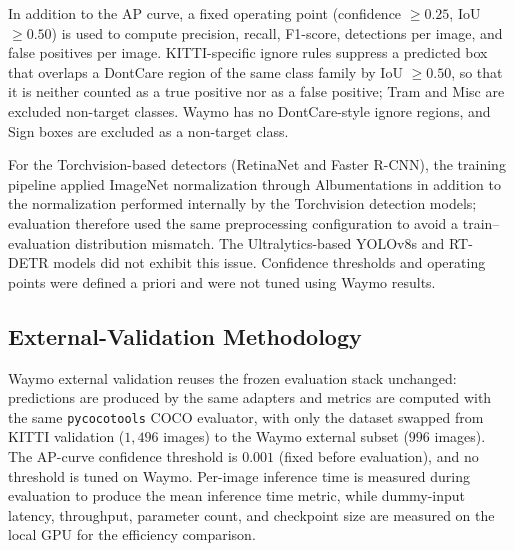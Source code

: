 In addition to the AP curve, a fixed operating point (confidence $\geq 0.25$, IoU $\geq
0.50$) is used to compute precision, recall, F1-score, detections per image, and false
positives per image. KITTI-specific ignore rules suppress a predicted box that overlaps a
DontCare region of the same class family by IoU $\geq 0.50$, so that it is neither counted
as a true positive nor as a false positive; Tram and Misc are excluded non-target classes.
Waymo has no DontCare-style ignore regions, and Sign boxes are excluded as a non-target
class.

For the Torchvision-based detectors (RetinaNet and Faster R-CNN), the training pipeline
applied ImageNet normalization through Albumentations in addition to the normalization
performed internally by the Torchvision detection models; evaluation therefore used the
same preprocessing configuration to avoid a train--evaluation distribution mismatch. The
Ultralytics-based YOLOv8s and RT-DETR models did not exhibit this issue. Confidence
thresholds and operating points were defined a priori and were not tuned using Waymo
results.

\subsection{External-Validation Methodology}
\label{sec:setup_external}

Waymo external validation reuses the frozen evaluation stack unchanged: predictions are
produced by the same adapters and metrics are computed with the same
\texttt{pycocotools} COCO evaluator, with only the dataset swapped from KITTI validation
($1{,}496$ images) to the Waymo external subset ($996$ images). The AP-curve confidence
threshold is $0.001$ (fixed before evaluation), and no threshold is tuned on Waymo.
Per-image inference time is measured during evaluation to produce the mean inference time
metric, while dummy-input latency, throughput, parameter count, and checkpoint size are
measured on the local GPU for the efficiency comparison.
